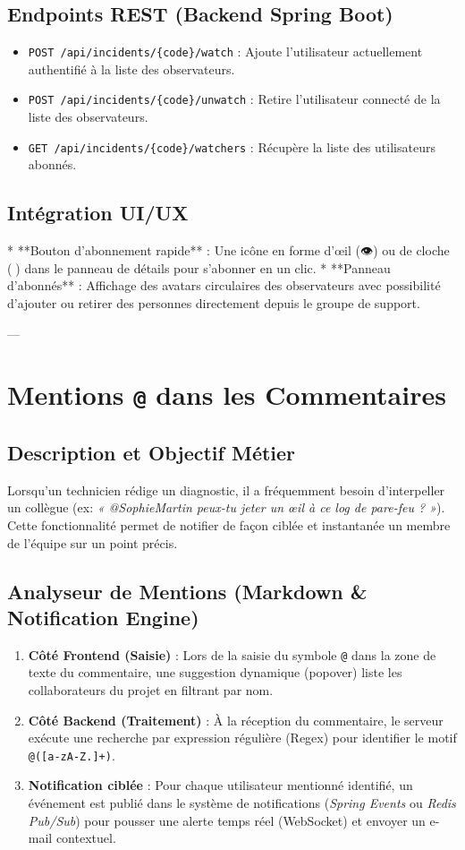 \documentclass[12pt,a4paper]{article}
\begin{document}
\subsection{Endpoints REST (Backend Spring Boot)}
\begin{itemize}
    \item \texttt{POST /api/incidents/\{code\}/watch} : Ajoute l'utilisateur actuellement authentifié à la liste des observateurs.
    \item \texttt{POST /api/incidents/\{code\}/unwatch} : Retire l'utilisateur connecté de la liste des observateurs.
    \item \texttt{GET /api/incidents/\{code\}/watchers} : Récupère la liste des utilisateurs abonnés.
\end{itemize}

\subsection{Intégration UI/UX}
* **Bouton d'abonnement rapide** : Une icône en forme d'œil (👁) ou de cloche (🔔) dans le panneau de détails pour s'abonner en un clic.
* **Panneau d'abonnés** : Affichage des avatars circulaires des observateurs avec possibilité d'ajouter ou retirer des personnes directement depuis le groupe de support.

---

\section{Mentions \texttt{@} dans les Commentaires}
\subsection{Description et Objectif Métier}
Lorsqu'un technicien rédige un diagnostic, il a fréquemment besoin d'interpeller un collègue (ex: \textit{« @SophieMartin peux-tu jeter un œil à ce log de pare-feu ? »}). Cette fonctionnalité permet de notifier de façon ciblée et instantanée un membre de l'équipe sur un point précis.

\subsection{Analyseur de Mentions (Markdown \& Notification Engine)}
\begin{enumerate}
    \item \textbf{Côté Frontend (Saisie)} : Lors de la saisie du symbole \texttt{@} dans la zone de texte du commentaire, une suggestion dynamique (popover) liste les collaborateurs du projet en filtrant par nom.
    \item \textbf{Côté Backend (Traitement)} : À la réception du commentaire, le serveur exécute une recherche par expression régulière (Regex) pour identifier le motif \texttt{@([a-zA-Z.]+)}.
    \item \textbf{Notification ciblée} : Pour chaque utilisateur mentionné identifié, un événement est publié dans le système de notifications (\textit{Spring Events} ou \textit{Redis Pub/Sub}) pour pousser une alerte temps réel (WebSocket) et envoyer un e-mail contextuel.
\end{enumerate}
\end{document}

